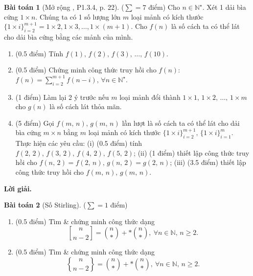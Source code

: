 \documentclass[a4paper, 11pt]{article}
\theoremstyle{definition}
\newtheorem{baitoan}{Bài toán}
\newcommand{\genstirlingI}[3]{%
    \genfrac{[}{]}{0pt}{#1}{#2}{#3}%
}
\newcommand{\genstirlingII}[3]{%
    \genfrac{\{}{\}}{0pt}{#1}{#2}{#3}%
}
\newcommand{\stirlingI}[2]{\genstirlingI{}{#1}{#2}}
\newcommand{\stirlingII}[2]{\genstirlingII{}{#1}{#2}}
\begin{document}







	\begin{tcolorbox}[breakable]
    	\begin{baitoan}[Mở rộng \cite{shahriari2021invitation}, P1.3.4, p. 22]
			($\sum = 7$ điểm)
			Cho $n\in\mathbb{N}^\star$. Xét 1 dải bìa cứng $1\times n$. Chúng ta có 1 số lượng lớn $m$ loại mảnh có kích thước $\{1\times i\}_{i=2}^{m+1} = 1\times2,1\times3,\ldots,1\times(m + 1)$. Cho $f(n)$ là số cách ta có thể lát cho dải bìa cứng bằng các mảnh của mình.
			\begin{enumerate}[label=(\alph*)]
				\item (0.5 điểm) Tính $f(1),\,f(2),\,f(3),\,\ldots,\,f(10)$. 
				\item (0.5 điểm) Chứng minh công thức truy hồi cho $f(n)$: $f(n) = \sum_{i=2}^{m + 1} f(n - i),\,\forall n\in\mathbb{N}^\star$.
				\item (1 điểm) Làm lại 2 ý trước nếu $m$ loại mảnh đổi thành $1\times1,\,1\times2,\,\ldots,\,1\times m$ cho $g(n)$ là số cách lát thỏa mãn. 
				\item (5 điểm) Gọi $f(m,\,n),\,g(m,\,n)$ lần lượt là số cách ta có thể lát cho dải bìa cứng $m\times n$ bằng $m$ loại mảnh có kích thước $\{1\times i\}_{i=2}^{m+1},\,\{1\times i\}_{i=1}^m$. Thực hiện các yêu cầu: (i) (0.5 điểm) tính $f(2,\,2),\,f(3,\,2),\,f(4,\,2),\,f(5,\,2)$; (ii) (1 điểm) thiết lập công thức truy hồi cho $f(n,\,2) = f(2,\,n),\,g(n,\,2) = g(2,\,n)$; (iii) (3.5 điểm) thiết lập công thức truy hồi cho $f(m,\,n),\,g(m,\,n)$.
			\end{enumerate}
		\end{baitoan}
	\end{tcolorbox}

	\textbf{Lời giải. }

	\begin{tcolorbox}[breakable]
    	\begin{baitoan}[Số Stirling]
			($\sum = 1$ điểm)
			\begin{enumerate}[label=(\alph*)]
				\item (0.5 điểm) \cite[P6.2.7]{shahriari2021invitation} Tìm \& chứng minh công thức dạng
				\begin{equation*}
					\stirlingI{n}{n - 2} = \binom{n}{*} + *\binom{n}{*},\ \forall n\in\mathbb{N},\,n\ge2.
				\end{equation*}
				\item (0.5 điểm) \cite[P6.1.13]{shahriari2021invitation} Tìm \& chứng minh công thức dạng
				\begin{equation*}
					\stirlingII{n}{n - 2} = \binom{n}{*} + *\binom{n}{*},\ \forall n\in\mathbb{N},\,n\ge2.
				\end{equation*} 
			\end{enumerate}
		\end{baitoan}
	\end{tcolorbox}
\end{document}
